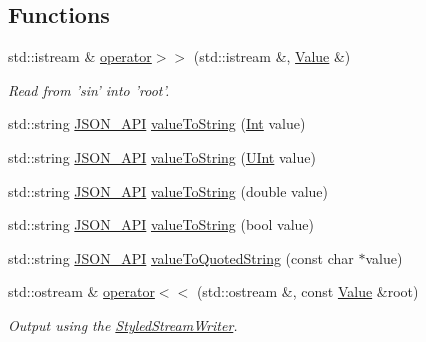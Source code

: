 \subsection*{Functions}
\begin{DoxyCompactItemize}
\item 
std\-::istream \& \hyperlink{namespaceJson_a4d245ef719cc0853e8e78eb5f99c16e5}{operator$>$$>$} (std\-::istream \&, \hyperlink{classJson_1_1Value}{Value} \&)
\begin{DoxyCompactList}\small\item\em Read from 'sin' into 'root'. \end{DoxyCompactList}\item 
std\-::string \hyperlink{inc_2json_2config_8h_a1d61ffde86ce1a18fd83194ff0d9a206}{J\-S\-O\-N\-\_\-\-A\-P\-I} \hyperlink{namespaceJson_a05cd078d8e086a4bcc08d40948f711e7}{value\-To\-String} (\hyperlink{namespaceJson_a08122e8005b706d982e48cca1e2119c7}{Int} value)
\item 
std\-::string \hyperlink{inc_2json_2config_8h_a1d61ffde86ce1a18fd83194ff0d9a206}{J\-S\-O\-N\-\_\-\-A\-P\-I} \hyperlink{namespaceJson_abcb58ea0f384c30608729a94d539e2ce}{value\-To\-String} (\hyperlink{namespaceJson_a800fb90eb6ee8d5d62b600c06f87f7d4}{U\-Int} value)
\item 
std\-::string \hyperlink{inc_2json_2config_8h_a1d61ffde86ce1a18fd83194ff0d9a206}{J\-S\-O\-N\-\_\-\-A\-P\-I} \hyperlink{namespaceJson_ac49317cb2f19e656c9cb548dd31e50d5}{value\-To\-String} (double value)
\item 
std\-::string \hyperlink{inc_2json_2config_8h_a1d61ffde86ce1a18fd83194ff0d9a206}{J\-S\-O\-N\-\_\-\-A\-P\-I} \hyperlink{namespaceJson_a959f412bb2e8a5cf50f2cc36cd7b3376}{value\-To\-String} (bool value)
\item 
std\-::string \hyperlink{inc_2json_2config_8h_a1d61ffde86ce1a18fd83194ff0d9a206}{J\-S\-O\-N\-\_\-\-A\-P\-I} \hyperlink{namespaceJson_aa89082c7ae7deaa6df955987015a0cbd}{value\-To\-Quoted\-String} (const char $\ast$value)
\item 
std\-::ostream \& \hyperlink{namespaceJson_a87bc83d7e90fc666d28aa16727deda2f}{operator$<$$<$} (std\-::ostream \&, const \hyperlink{classJson_1_1Value}{Value} \&root)
\begin{DoxyCompactList}\small\item\em Output using the \hyperlink{classJson_1_1StyledStreamWriter}{Styled\-Stream\-Writer}. \end{DoxyCompactList}\end{DoxyCompactItemize}


